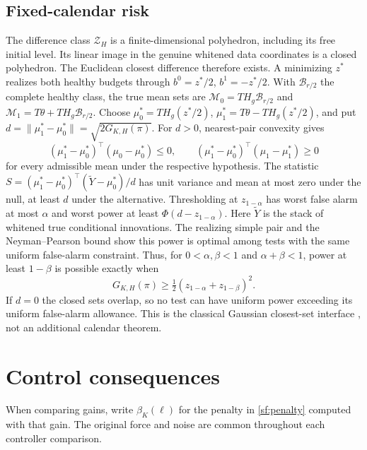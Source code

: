 \subsection{Fixed-calendar risk}\label{sf:risk}
The difference class $\mathcal Z_H$ is a finite-dimensional polyhedron, including
its free initial level. Its linear image in the genuine whitened data coordinates
is a closed polyhedron. The Euclidean closest difference therefore exists.
A minimizing $z^*$ realizes both healthy budgets through
$b^0=z^*/2$, $b^1=-z^*/2$. With $\mathcal B_{r/2}$ the complete healthy class,
the true mean sets are $\mathcal M_0=T H_g\mathcal B_{r/2}$ and
$\mathcal M_1=T \theta+T H_g\mathcal B_{r/2}$.
Choose $\mu_0^*=T H_g(z^*/2)$, $\mu_1^*=T \theta-T H_g(z^*/2)$, and put
$d=\|\mu_1^*-\mu_0^*\|=\sqrt{2G_{K,H}(\pi)}$.
For $d>0$, nearest-pair convexity gives
\[
(\mu_1^*-\mu_0^*)^\top(\mu_0-\mu_0^*)\le0,\qquad
(\mu_1^*-\mu_0^*)^\top(\mu_1-\mu_1^*)\ge0
\]
for every admissible mean under the respective hypothesis.
The statistic
$S=(\mu_1^*-\mu_0^*)^\top(\widetilde Y-\mu_0^*)/d$
has unit variance and mean at most zero under the null, at least $d$ under
the alternative. Thresholding at $z_{1-\alpha}$ has worst false alarm
at most $\alpha$ and worst power at least
$\Phi(d-z_{1-\alpha})$.
Here $\widetilde Y$ is the stack of whitened true conditional innovations.
The realizing simple pair and the Neyman--Pearson bound show this power is
optimal among tests with the same uniform false-alarm constraint.
Thus, for $0<\alpha,\beta<1$ and $\alpha+\beta<1$, power at least
$1-\beta$ is possible exactly when
\[
G_{K,H}(\pi)\ge\tfrac12(z_{1-\alpha}+z_{1-\beta})^2.
\]
If $d=0$ the closed sets overlap, so no test can have uniform power exceeding
its uniform false-alarm allowance. This is the classical Gaussian closest-set
interface \cite{convex}, not an additional calendar theorem.
\section{Control consequences}\label{sf:control}
When comparing gains, write $\beta_K(\ell)$ for the penalty in
\eqref{sf:penalty} computed with that gain. The original force and noise
are common throughout each controller comparison.
